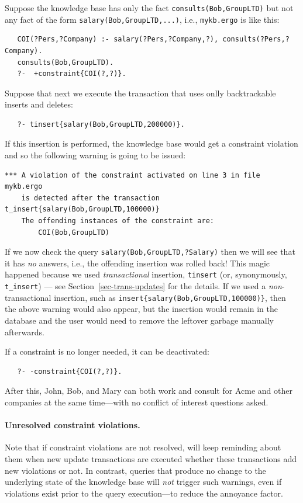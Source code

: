 Suppose the knowledge base has only the fact
\texttt{consults(Bob,GroupLTD)}
but not any fact of the form \texttt{salary(Bob,GroupLTD,...)}, i.e.,
\texttt{mykb.ergo} is like this:
\begin{verbatim}
   COI(?Pers,?Company) :- salary(?Pers,?Company,?), consults(?Pers,?Company).
   consults(Bob,GroupLTD).
   ?-  +constraint{COI(?,?)}.
\end{verbatim}
Suppose that next we execute the transaction that uses onlly backtrackable
inserts and deletes:
\begin{verbatim}
   ?- tinsert{salary(Bob,GroupLTD,200000)}.
\end{verbatim}
If this insertion is performed, the knowledge base would get a
constraint violation
and so the following warning is going to be issued:
\begin{verbatim}
*** A violation of the constraint activated on line 3 in file mykb.ergo
    is detected after the transaction t_insert{salary(Bob,GroupLTD,100000)}
    The offending instances of the constraint are:
        COI(Bob,GroupLTD)
\end{verbatim}
If we now check the query \texttt{salary(Bob,GroupLTD,?Salary)} then we will
see that it has \emph{no} answers,
i.e., the offending insertion was rolled back!
This magic happened because we used \emph{transactional} insertion,
\texttt{tinsert} (or, synonymously, \texttt{t\_insert}) --- see
Section~\ref{sec-trans-updates} for the details.
If we used  a \emph{non}-transactional insertion, such as 
\texttt{insert\{salary(Bob,GroupLTD,100000)\}}, then the above warning would
also appear, but the insertion would remain in the database  and the user would
need to remove the leftover garbage manually afterwards.

If a constraint is no longer needed, it can be deactivated:
\begin{verbatim}
   ?- -constraint{COI(?,?)}.
\end{verbatim}
After this, John, Bob, and Mary can both work and consult for Acme and
other companies at the same time---with no conflict of interest questions
asked.

\paragraph{Unresolved constraint violations.}
Note that if constraint violations are not resolved, \ERGO will keep
reminding about them when new update transactions are executed whether
these transactions add new violations or not.
In contrast, queries that produce no change to the underlying state of the
knowledge
base will \emph{not} trigger such warnings, even if violations exist
prior to the query execution---to reduce
the annoyance factor.

